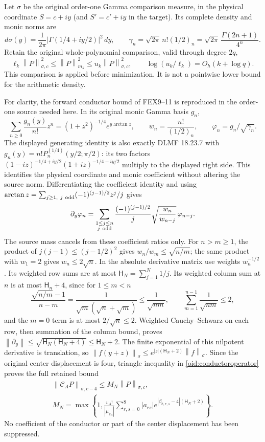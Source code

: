 \documentclass[11pt,a4paper]{article}
\newcommand{\norm}[1]{\left\lVert#1\right\rVert}
\begin{document}
Let $\sigma$ be the original order-one Gamma comparison measure,
in the physical coordinate $S=c+iy$ (and $S'=c'+iy$ in the target).
Its complete density and monic norms are
\[
 d\sigma(y)=\frac1{2\pi}|\Gamma(1/4+iy/2)|^2\,dy,\qquad
 \gamma_n=\sqrt{2\pi}\,n!(1/2)_n
 =\sqrt{2\pi}\,\frac{\Gamma(2n+1)}{4^n}.
\]
Retain the original whole-polynomial comparison, valid through degree
$2q$,
\begin{equation}\label{oid:comparison}
 \ell_k\norm P_{\sigma,c}^2\le\norm P_{m_k}^2
 \le u_k\norm P_{\sigma,c}^2,
 \qquad \log(u_k/\ell_k)=O_h(k+\log q).
\end{equation}
This comparison is applied before minimization. It is not a
pointwise lower bound for the arithmetic density.

For clarity, the forward conductor bound of FEX9--11 is reproduced
in the order-one source needed here. In its original monic Gamma
basis $g_n$,
\[
 \sum_{n\ge0}\frac{g_n(y)}{n!}z^n
 =(1+z^2)^{-1/4}e^{y\arctan z},\qquad
 w_n=\frac{n!}{(1/2)_n},\qquad \varphi_n=g_n/\sqrt{\gamma_n}.
\]
The displayed generating identity is also exactly DLMF 18.23.7
\cite{DLMF18} with
$g_n(y)=n!P_n^{(1/4)}(y/2;\pi/2)$: its two factors
$(1-iz)^{-1/4+iy/2}(1+iz)^{-1/4-iy/2}$ multiply to the displayed
right side. This identifies the physical coordinate and monic
coefficient without altering the source norm.
Differentiating the coefficient identity and using
$\arctan z=\sum_{j\ge1,\ j\ {\rm odd}}(-1)^{(j-1)/2}z^j/j$
gives
\[
 \partial_y\varphi_n=
 \sum_{\substack{1\le j\le n\\j\ {\rm odd}}}
 \frac{(-1)^{(j-1)/2}}{j}\sqrt{\frac{w_n}{w_{n-j}}}\,
 \varphi_{n-j}.
\]
The source mass cancels from these coefficient ratios only.
For $n>m\ge1$, the product of
$j(j-1)\le(j-1/2)^2$ gives $w_n/w_m\le\sqrt{n/m}$;
the same product with $w_1=2$ gives $w_n\le2\sqrt n$.
In the absolute derivative matrix use weights $w_n^{-1/2}$.
Its weighted row sums are at most
$\mathsf H_N=\sum_{j=1}^N1/j$. Its weighted column sum at $n$ is
at most $\mathsf H_n+4$, since for $1\le m<n$
\[
 \frac{\sqrt{n/m}-1}{n-m}
 =\frac1{\sqrt m(\sqrt n+\sqrt m)}\le\frac1{\sqrt{nm}},
 \qquad \sum_{m=1}^{n-1}\frac1{\sqrt{nm}}\le2,
\]
and the $m=0$ term is at most $2/\sqrt n\le2$.
Weighted Cauchy--Schwarz on each row, then summation of the column
bound, proves
$\norm{\partial_y}\le\sqrt{\mathsf H_N(\mathsf H_N+4)}
\le\mathsf H_N+2$. The finite exponential of this nilpotent
derivative is translation, so
$\norm{f(y+z)}_\sigma\le e^{|z|(\mathsf H_N+2)}\norm f_\sigma$.
Since the original center displacement is four, triangle inequality
in \eqref{oid:conductoroperator} proves the full retained bound
\begin{equation}\label{oid:forward}
 \begin{gathered}
 \norm{\mathcal C_AP}_{\sigma,c-4}\le M_N\norm P_{\sigma,c},\\
 M_N=\max\left\{1,\frac{v_A!}{|\mu_{v_A}|}
 \sum_{r,s=0}^8|a_{rs}|
 e^{|\beta_{8,r,s}-4|(\mathsf H_N+2)}\right\}.
 \end{gathered}
\end{equation}
No coefficient of the conductor or part of the center displacement
has been suppressed.
\end{document}

